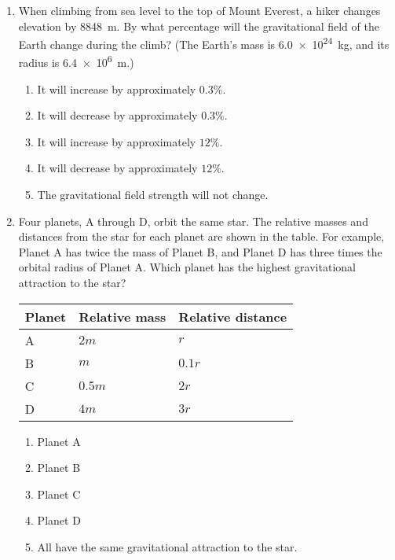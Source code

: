 \documentclass[12pt]{article}
\begin{document}
\begin{enumerate}[leftmargin=50pt,label=\underline{\hspace{0.4in}} \arabic*.]
\item When climbing from sea level to the top of Mount Everest, a hiker
  changes elevation by \SI{8848}{m}. By what percentage will the
  gravitational field of the Earth change during the climb? (The Earth's
  mass is \SI{6.0e24}{kg}, and its radius is \SI{6.4e6}{m}.)
  \begin{enumerate}[noitemsep,topsep=0pt,leftmargin=18pt]
  \item It will increase by approximately $0.3\%$.
  \item It will decrease by approximately $0.3\%$.
  \item It will increase by approximately $12\%$.
  \item It will decrease by approximately $12\%$.
  \item The gravitational field strength will not change.
  \end{enumerate}
  \newpage
  
\item Four planets, A through D, orbit the same star. The relative masses and
  distances from the star for each planet are shown in the table. For
  example, Planet A has twice the mass of Planet B, and Planet D has
  three times the orbital radius of Planet A. Which planet has the highest
  gravitational attraction to the star?
  \begin{center}
    \begin{tabular}{lll}
      \hline
      \textbf{Planet} & \textbf{Relative mass} & \textbf{Relative distance}\\
      \hline
      A\hspace{0.4in}& $2m$   & $r$    \\ \hline
      B & $m$    & $0.1r$\hspace{0.25in} \\ \hline
      C & $0.5m$\hspace{0.25in} & $2r$   \\ \hline
      D & $4m$   & $3r$   \\ \hline
    \end{tabular}
  \end{center}
  \begin{enumerate}[noitemsep,topsep=0pt,leftmargin=18pt]
  \item Planet A
  \item Planet B
  \item Planet C
  \item Planet D
  \item All have the same gravitational attraction to the star.
  \end{enumerate}


\end{enumerate}
\end{document}
